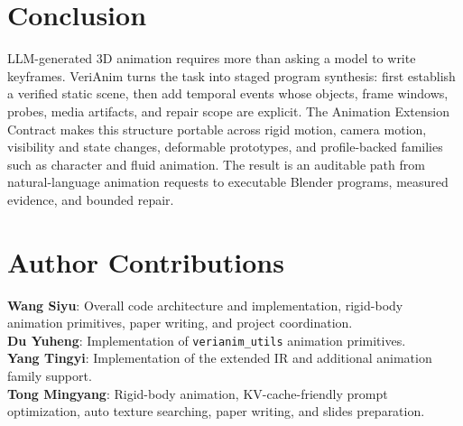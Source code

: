 \documentclass{article}
\newcommand{\code}[1]{\texttt{#1}}
\begin{document}
\section{Conclusion}

LLM-generated 3D animation requires more than asking a model to write keyframes. VeriAnim turns the task into staged program synthesis: first establish a verified static scene, then add temporal events whose objects, frame windows, probes, media artifacts, and repair scope are explicit. The Animation Extension Contract makes this structure portable across rigid motion, camera motion, visibility and state changes, deformable prototypes, and profile-backed families such as character and fluid animation. The result is an auditable path from natural-language animation requests to executable Blender programs, measured evidence, and bounded repair.

\section*{Author Contributions}

\textbf{Wang Siyu}: Overall code architecture and implementation, rigid-body animation primitives, paper writing, and project coordination. \\
\textbf{Du Yuheng}: Implementation of \code{verianim\_utils} animation primitives. \\
\textbf{Yang Tingyi}: Implementation of the extended IR and additional animation family support. \\
\textbf{Tong Mingyang}: Rigid-body animation, KV-cache-friendly prompt optimization, auto texture searching, paper writing, and slides preparation. \\



\end{document}
